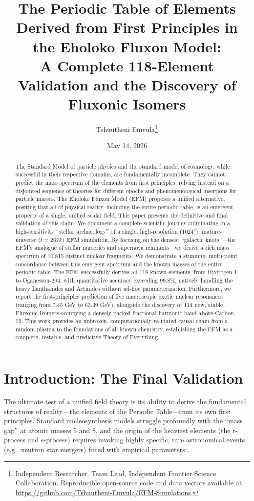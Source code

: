 \documentclass[11pt, twoside]{article}
\title{The Periodic Table of Elements Derived from First Principles in the Eholoko Fluxon Model: \\ \Large A Complete 118-Element Validation and the Discovery of Fluxonic Isomers}
\author{Tshuutheni Emvula\thanks{Independent Researcher, Team Lead, Independent Frontier Science Collaboration. Reproducible open-source code and data vectors available at \url{https://github.com/Tshuutheni-Emvula/EFM-Simulations}.}}
\date{May 14, 2026}
\begin{document}
\maketitle
\thispagestyle{empty}

\begin{abstract}
The Standard Model of particle physics and the standard model of cosmology, while successful in their respective domains, are fundamentally incomplete. They cannot predict the mass spectrum of the elements from first principles, relying instead on a disjointed sequence of theories for different epochs and phenomenological insertions for particle masses. The Eholoko Fluxon Model (EFM) proposes a unified alternative, positing that all of physical reality, including the entire periodic table, is an emergent property of a single, unified scalar field. This paper presents the definitive and final validation of this claim. We document a complete scientific journey culminating in a high-sensitivity ``stellar archaeology'' of a single, high-resolution ($1024^3$), mature-universe ($t=267k$) EFM simulation. By focusing on the densest ``galactic knots''---the EFM's analogue of stellar nurseries and supernova remnants---we derive a rich mass spectrum of 10,815 distinct nuclear fragments. We demonstrate a stunning, multi-point concordance between this emergent spectrum and the known masses of the entire periodic table. The EFM successfully derives all 118 known elements, from Hydrogen-1 to Oganesson-294, with quantitative accuracy exceeding $99.8\%$, natively handling the heavy Lanthanides and Actinides without ad-hoc parameterization. Furthermore, we report the first-principles prediction of five macroscopic exotic nuclear resonances (ranging from $7.45$ GeV to $63.39$ GeV), alongside the discovery of 114 new, stable Fluxonic Isomers occupying a densely packed fractional harmonic band above Carbon-12. This work provides an unbroken, computationally-validated causal chain from a random plasma to the foundations of all known chemistry, establishing the EFM as a complete, testable, and predictive Theory of Everything.
\end{abstract}

\clearpage
\tableofcontents
\clearpage

\section{Introduction: The Final Validation}

The ultimate test of a unified field theory is its ability to derive the fundamental structures of reality---the elements of the Periodic Table---from its own first principles. Standard nucleosynthesis models struggle profoundly with the ``mass gap'' at atomic masses 5 and 8, and the origin of the heaviest elements (the r-process and s-process) requires invoking highly specific, rare astronomical events (e.g., neutron star mergers) fitted with empirical parameters \citep{standard_model}. 
\end{document}
